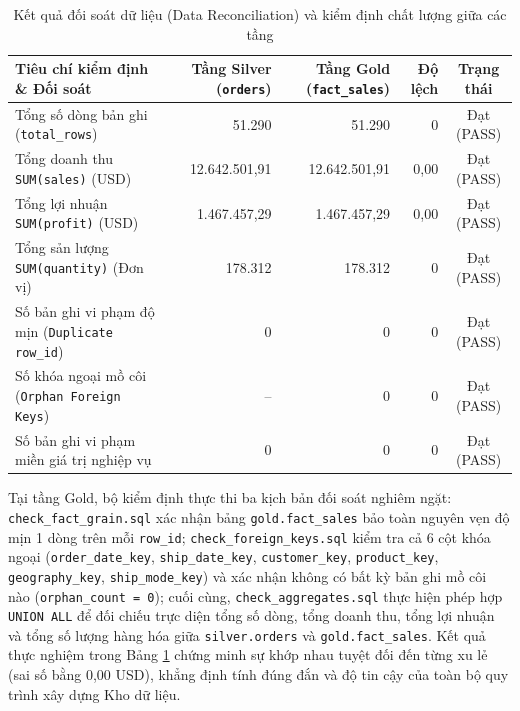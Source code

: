 \begin{table}[H]
\centering
\caption{Kết quả đối soát dữ liệu (Data Reconciliation) và kiểm định chất lượng giữa các tầng}
\label{tab:data_reconciliation}
\small
\renewcommand{\arraystretch}{1.25}
\begin{tabularx}{\textwidth}{|X|r|r|r|c|}
\hline
\textbf{Tiêu chí kiểm định \& Đối soát} & \textbf{Tầng Silver (\texttt{orders})} & \textbf{Tầng Gold (\texttt{fact\_sales})} & \textbf{Độ lệch} & \textbf{Trạng thái} \\
\hline
Tổng số dòng bản ghi (\texttt{total\_rows}) & 51.290 & 51.290 & 0 & Đạt (PASS) \\
\hline
Tổng doanh thu \texttt{SUM(sales)} (USD) & 12.642.501,91 & 12.642.501,91 & 0,00 & Đạt (PASS) \\
\hline
Tổng lợi nhuận \texttt{SUM(profit)} (USD) & 1.467.457,29 & 1.467.457,29 & 0,00 & Đạt (PASS) \\
\hline
Tổng sản lượng \texttt{SUM(quantity)} (Đơn vị) & 178.312 & 178.312 & 0 & Đạt (PASS) \\
\hline
Số bản ghi vi phạm độ mịn (\texttt{Duplicate row\_id}) & 0 & 0 & 0 & Đạt (PASS) \\
\hline
Số khóa ngoại mồ côi (\texttt{Orphan Foreign Keys}) & -- & 0 & 0 & Đạt (PASS) \\
\hline
Số bản ghi vi phạm miền giá trị nghiệp vụ & 0 & 0 & 0 & Đạt (PASS) \\
\hline
\end{tabularx}
\end{table}

Tại tầng Gold, bộ kiểm định thực thi ba kịch bản đối soát nghiêm ngặt: \texttt{check\_fact\_grain.sql} xác nhận bảng \texttt{gold.fact\_sales} bảo toàn nguyên vẹn độ mịn 1 dòng trên mỗi \texttt{row\_id}; \texttt{check\_foreign\_keys.sql} kiểm tra cả 6 cột khóa ngoại (\texttt{order\_date\_key}, \texttt{ship\_date\_key}, \texttt{customer\_key}, \texttt{product\_key}, \texttt{geography\_key}, \texttt{ship\_mode\_key}) và xác nhận không có bất kỳ bản ghi mồ côi nào (\texttt{orphan\_count = 0}); cuối cùng, \texttt{check\_aggregates.sql} thực hiện phép hợp \texttt{UNION ALL} để đối chiếu trực diện tổng số dòng, tổng doanh thu, tổng lợi nhuận và tổng số lượng hàng hóa giữa \texttt{silver.orders} và \texttt{gold.fact\_sales}. Kết quả thực nghiệm trong Bảng \ref{tab:data_reconciliation} chứng minh sự khớp nhau tuyệt đối đến từng xu lẻ (sai số bằng 0,00 USD), khẳng định tính đúng đắn và độ tin cậy của toàn bộ quy trình xây dựng Kho dữ liệu.
